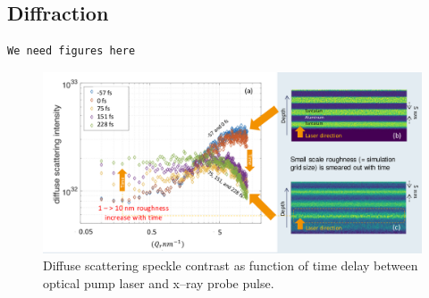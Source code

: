 \documentclass[preprint, 12pt]{elsarticle}
\begin{document}
\subsection{Diffraction\label{diffraction}}
\begin{verbatim}
We need figures here
\end{verbatim}
%
\begin{figure}[ht]
  \begin{center}
    \includegraphics[width=.8\textwidth,angle=0,clip]{figures/TaAl_diffuse_scattering}
  \end{center}
  \caption{Diffuse scattering speckle contrast as function of time delay between
    optical pump laser and x--ray probe pulse.}
  \label{fig:TaAl_diffuse_scattering}
\end{figure}
\end{document}
